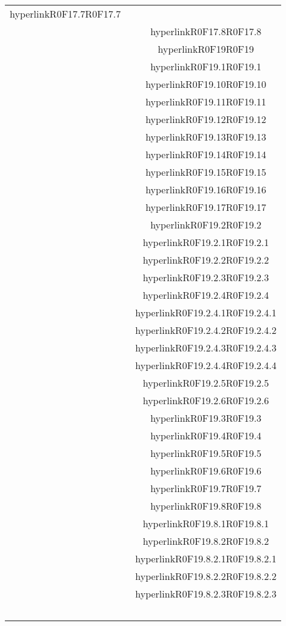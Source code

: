 \documentclass[../AnalisiDeiRequisiti.tex]{subfiles}
\begin{document}
\begin{longtable}{|c|c|}
	hyperlink{R0F17.7}{R0F17.7}\\& \
	hyperlink{R0F17.8}{R0F17.8}\\& \
	hyperlink{R0F19}{R0F19}\\& \
	hyperlink{R0F19.1}{R0F19.1}\\& \
	hyperlink{R0F19.10}{R0F19.10}\\& \
	hyperlink{R0F19.11}{R0F19.11}\\& \
	hyperlink{R0F19.12}{R0F19.12}\\& \
	hyperlink{R0F19.13}{R0F19.13}\\& \
	hyperlink{R0F19.14}{R0F19.14}\\& \
	hyperlink{R0F19.15}{R0F19.15}\\& \
	hyperlink{R0F19.16}{R0F19.16}\\& \
	hyperlink{R0F19.17}{R0F19.17}\\& \
	hyperlink{R0F19.2}{R0F19.2}\\& \
	hyperlink{R0F19.2.1}{R0F19.2.1}\\& \
	hyperlink{R0F19.2.2}{R0F19.2.2}\\& \
	hyperlink{R0F19.2.3}{R0F19.2.3}\\& \
	hyperlink{R0F19.2.4}{R0F19.2.4}\\& \
	hyperlink{R0F19.2.4.1}{R0F19.2.4.1}\\& \
	hyperlink{R0F19.2.4.2}{R0F19.2.4.2}\\& \
	hyperlink{R0F19.2.4.3}{R0F19.2.4.3}\\& \
	hyperlink{R0F19.2.4.4}{R0F19.2.4.4}\\& \
	hyperlink{R0F19.2.5}{R0F19.2.5}\\& \
	hyperlink{R0F19.2.6}{R0F19.2.6}\\& \
	hyperlink{R0F19.3}{R0F19.3}\\& \
	hyperlink{R0F19.4}{R0F19.4}\\& \
	hyperlink{R0F19.5}{R0F19.5}\\& \
	hyperlink{R0F19.6}{R0F19.6}\\& \
	hyperlink{R0F19.7}{R0F19.7}\\& \
	hyperlink{R0F19.8}{R0F19.8}\\& \
	hyperlink{R0F19.8.1}{R0F19.8.1}\\& \
	hyperlink{R0F19.8.2}{R0F19.8.2}\\& \
	hyperlink{R0F19.8.2.1}{R0F19.8.2.1}\\& \
	hyperlink{R0F19.8.2.2}{R0F19.8.2.2}\\& \
	hyperlink{R0F19.8.2.3}{R0F19.8.2.3}\\& \

\end{longtable}
\end{document}
